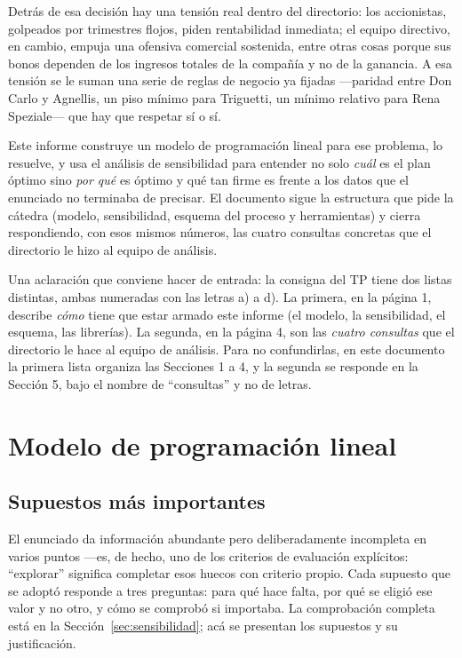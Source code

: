 \documentclass[10pt,a4paper]{article}
\begin{document}
Detrás de esa decisión hay una tensión real dentro del directorio: los
accionistas, golpeados por trimestres flojos, piden rentabilidad inmediata;
el equipo directivo, en cambio, empuja una ofensiva comercial sostenida, entre
otras cosas porque sus bonos dependen de los ingresos totales de la compañía y no
de la ganancia. A esa tensión se le suman una serie de reglas de negocio ya
fijadas —paridad entre Don Carlo y Agnellis, un piso mínimo para Triguetti, un
mínimo relativo para Rena Speziale— que hay que respetar sí o sí.

Este informe construye un modelo de programación lineal para ese problema, lo
resuelve, y usa el análisis de sensibilidad para entender no solo \emph{cuál}
es el plan óptimo sino \emph{por qué} es óptimo y qué tan firme es frente a los
datos que el enunciado no terminaba de precisar. El documento sigue la
estructura que pide la cátedra \cite{catedra-clases} (modelo, sensibilidad,
esquema del proceso y herramientas) y cierra respondiendo, con esos mismos
números, las cuatro consultas concretas que el directorio le hizo al equipo de
análisis.

Una aclaración que conviene hacer de entrada: la consigna del TP tiene dos
listas distintas, ambas numeradas con las letras a) a d). La primera, en la
página 1, describe \emph{cómo} tiene que estar armado este informe (el modelo,
la sensibilidad, el esquema, las librerías). La segunda, en la página 4,
son las \emph{cuatro consultas} que el directorio le hace al equipo de
análisis. Para no confundirlas, en este documento la primera lista organiza las
Secciones 1 a 4, y la segunda se responde en la Sección 5, bajo el nombre de
``consultas'' y no de letras.

\section{Modelo de programación lineal}

\subsection{Supuestos más importantes}
\label{sec:supuestos}

El enunciado da información abundante pero deliberadamente incompleta en
varios puntos —es, de hecho, uno de los criterios de evaluación explícitos:
``explorar'' significa completar esos huecos con criterio propio. Cada
supuesto que se adoptó responde a tres preguntas: para qué hace falta, por qué
se eligió ese valor y no otro, y cómo se comprobó si importaba. La comprobación
completa está en la Sección~\ref{sec:sensibilidad}; acá se presentan los
supuestos y su justificación.
\end{document}

